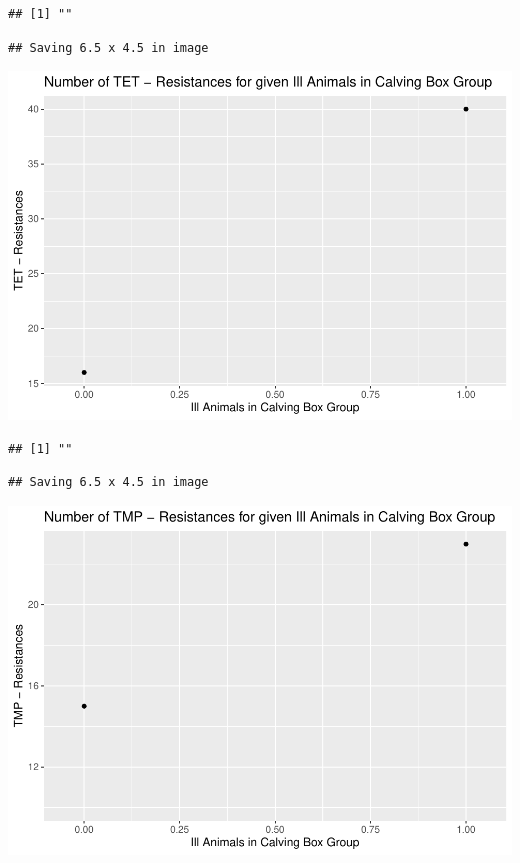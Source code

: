 \documentclass[
]{article}
\begin{document}
\begin{verbatim}
## [1] ""
\end{verbatim}

\begin{verbatim}
## Saving 6.5 x 4.5 in image
\end{verbatim}

\includegraphics{NResistenzen_files/figure-latex/binary_or_nominal_variables-28.pdf}

\begin{verbatim}
## [1] ""
\end{verbatim}

\begin{verbatim}
## Saving 6.5 x 4.5 in image
\end{verbatim}

\includegraphics{NResistenzen_files/figure-latex/binary_or_nominal_variables-29.pdf}
\end{document}
